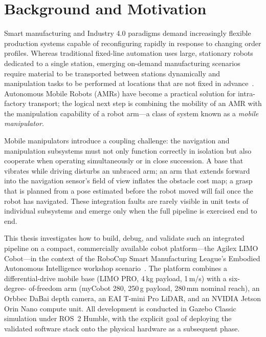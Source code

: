
\section{Background and Motivation}
Smart manufacturing and Industry 4.0 paradigms demand increasingly flexible production
systems capable of reconfiguring rapidly in response to changing order profiles. Whereas
traditional fixed-line automation uses large, stationary robots dedicated to a single
station, emerging on-demand manufacturing scenarios require material to be transported
between stations dynamically and manipulation tasks to be performed at locations that
are not fixed in advance~\cite{masannek2026eaiws}. Autonomous Mobile Robots (AMRs) have
become a practical solution for intra-factory transport; the logical next step is
combining the mobility of an AMR with the manipulation capability of a robot arm---a
class of system known as a \emph{mobile manipulator}.

Mobile manipulators introduce a coupling challenge: the navigation and manipulation
subsystems must not only function correctly in isolation but also cooperate when
operating simultaneously or in close succession. A base that vibrates while driving
disturbs an unbraced arm; an arm that extends forward into the navigation sensor's
field of view inflates the obstacle cost map; a grasp that is planned from a pose
estimated before the robot moved will fail once the robot has navigated. These
integration faults are rarely visible in unit tests of individual subsystems and emerge
only when the full pipeline is exercised end to end.

This thesis investigates how to build, debug, and validate such an integrated pipeline
on a compact, commercially available cobot platform---the Agilex LIMO Cobot---in the
context of the RoboCup Smart Manufacturing League's Embodied Autonomous Intelligence
workshop scenario~\cite{masannek2026eaiws,dissanayaka2025sml}. The platform combines a
differential-drive mobile base (LIMO PRO, 4\,kg payload, 1\,m/s) with a six-degree-
of-freedom arm (myCobot 280, 250\,g payload, 280\,mm nominal reach), an Orbbec DaBai
depth camera, an EAI T-mini Pro LiDAR, and an NVIDIA Jetson Orin Nano compute unit.
All development is conducted in Gazebo Classic simulation under ROS~2 Humble, with
the explicit goal of deploying the validated software stack onto the physical hardware
as a subsequent phase.

